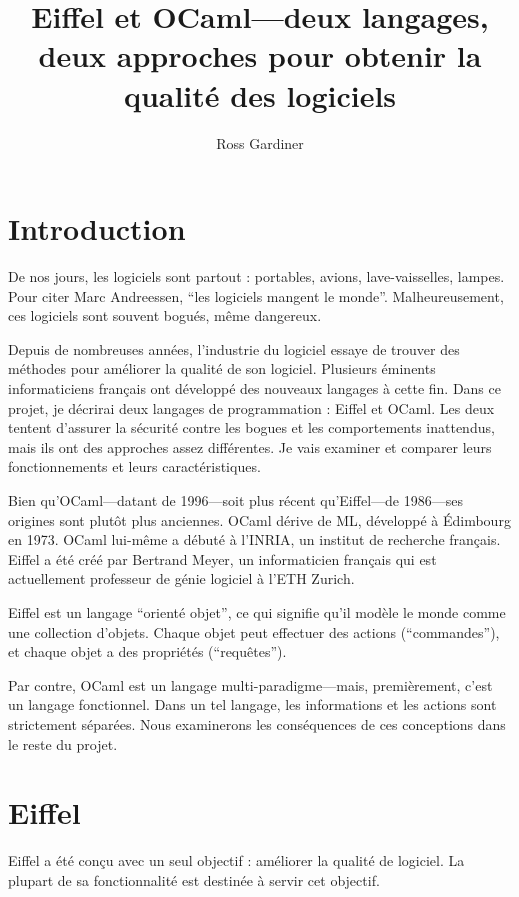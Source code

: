 \documentclass[french]{report}
\title{Eiffel et OCaml---deux langages, deux approches pour obtenir la qualité des logiciels}
\author{Ross Gardiner}
\begin{document}
\maketitle

\tableofcontents

\chapter{Introduction}

De nos jours, les logiciels sont partout : portables, avions, lave-vaisselles, lampes. Pour citer Marc Andreessen, \enquote{les logiciels mangent le monde}. Malheureusement, ces logiciels sont souvent bogués, m\^{e}me dangereux.

Depuis de nombreuses années, l’industrie du logiciel essaye de trouver des méthodes pour améliorer la qualité de son logiciel. Plusieurs éminents informaticiens français ont développé des nouveaux langages à cette fin. Dans ce projet, je décrirai deux langages de programmation : Eiffel et OCaml. Les deux tentent d’assurer la sécurité contre les bogues et les comportements inattendus, mais ils ont des approches assez différentes. Je vais examiner et comparer leurs fonctionnements et leurs caractéristiques.

Bien qu'OCaml---datant de 1996---soit plus récent qu'Eiffel---de 1986---ses origines sont plutôt plus anciennes.  OCaml dérive de ML, développé à Édimbourg en 1973. OCaml lui-m\^{e}me a débuté à l’INRIA, un institut de recherche français. Eiffel a été créé par Bertrand Meyer, un informaticien français qui est actuellement professeur de génie logiciel à l’ETH Zurich.

Eiffel est un langage \enquote{orienté objet}, ce qui signifie qu'il modèle le monde comme une collection d’objets. Chaque objet peut effectuer des actions (\enquote{commandes}), et chaque objet a des propriétés (\enquote{requêtes}).

Par contre, OCaml est un langage multi-paradigme---mais, premièrement, c’est un langage fonctionnel. Dans un tel langage, les informations et les actions sont strictement séparées. Nous examinerons les conséquences de ces conceptions dans le reste du projet.

\chapter{Eiffel}

Eiffel a été conçu avec un seul objectif : améliorer la qualité de logiciel. La plupart de sa fonctionnalité est destinée à servir cet objectif.
 
\end{document}
